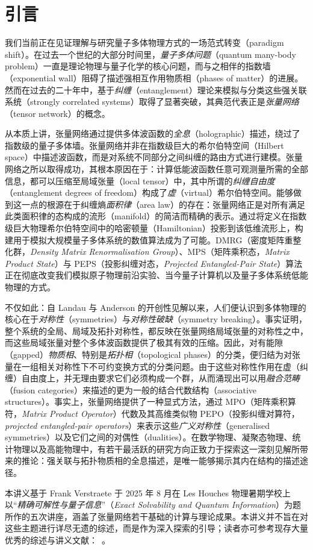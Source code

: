 \section*{引言}
我们当前正在见证理解与研究量子多体物理方式的一场范式转变（paradigm shift）。在过去一个世纪的大部分时间里，\emph{量子多体问题}（quantum many-body problem）一直是理论物理与量子化学的核心问题，而与之相伴的指数墙（exponential wall）阻碍了描述强相互作用物质相（phases of matter）的进展。然而在过去的二十年中，基于\emph{纠缠}（entanglement）理论来模拟与分类这些强关联系统（strongly correlated systems）取得了显著突破，其典范代表正是\emph{张量网络}（tensor network）的概念。

从本质上讲，张量网络通过提供多体波函数的\emph{全息}（holographic）描述，绕过了指数级的量子多体墙。张量网络并非在指数级巨大的希尔伯特空间（Hilbert space）中描述波函数，而是对系统不同部分之间纠缠的路由方式进行建模。张量网络之所以取得成功，其根本原因在于：计算低能波函数任意可观测量所需的全部信息，都可以压缩至局域张量（local tensor）中，其中所谓的\emph{纠缠自由度}（entanglement degrees of freedom）构成了\emph{虚}（virtual）希尔伯特空间。能够做到这一点的根源在于纠缠熵\emph{面积律}（area law）的存在：张量网络正是对所有满足此类面积律的态构成的流形（manifold）的简洁而精确的表示。通过将定义在指数级巨大物理希尔伯特空间中的哈密顿量（Hamiltonian）投影到该低维流形上，构建用于模拟大规模量子多体系统的数值算法成为了可能。DMRG（密度矩阵重整化群，\emph{Density Matrix Renormalisation Group}）、MPS（矩阵乘积态，\emph{Matrix Product State}）与 PEPS（投影纠缠对态，\emph{Projected Entangled-Pair State}）算法正在彻底改变我们模拟原子物理前沿实验、当今量子计算机以及量子多体系统低能物理的方式。

不仅如此：自 Landau 与 Anderson 的开创性见解以来，人们便认识到多体物理的核心在于\emph{对称性}（symmetries）与\emph{对称性破缺}（symmetry breaking）。事实证明，整个系统的全局、局域及拓扑对称性，都反映在张量网络局域张量的对称性之中，而这些局域张量对整个多体波函数提供了极其有效的压缩。因此，对有能隙（gapped）\emph{物质相}、特别是\emph{拓扑相}（topological phases）的分类，便归结为对张量在一组相关对称性下不可约变换方式的分类问题。由于这些对称性作用在虚（纠缠）自由度上，并无理由要求它们必须构成一个群，从而涌现出可以用\emph{融合范畴}（fusion categories）来描述的更为一般的结合代数结构（associative structures）。事实上，张量网络提供了一种显式方法，通过 MPO（矩阵乘积算符，\emph{Matrix Product Operator}）代数及其高维类似物 PEPO（投影纠缠对算符，\emph{projected entangled-pair operators}）来表示这些\emph{广义对称性}（generalised symmetries）以及它们之间的对偶性（dualities）。在数学物理、凝聚态物理、统计物理以及高能物理中，有若干最活跃的研究方向正致力于探索这一深刻见解所带来的推论：强关联与拓扑物质相的全息描述，是唯一能够揭示其内在结构的描述途径。

\bigskip\noindent 本讲义基于 Frank Verstraete 于 2025 年 8 月在 Les Houches 物理暑期学校上以“\emph{精确可解性与量子信息}”（\emph{Exact Solvability and Quantum Information}）为题所作的五次讲座，涵盖了张量网络若干基础的计算与理论成果。本讲义并不旨在对这些主题进行详尽无遗的综述，而是作为深入探索的引导；读者亦可参考现存大量优秀的综述与讲义文献：~\cite{Verstraete2008,Schollwoeck2010,Bridgeman2016,Vanderstraeten2019,Cirac2020,Xiang2023,Banuls2022,Verstraete2023,Chen2025}。